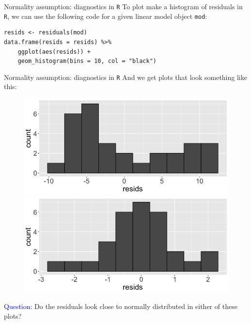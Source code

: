 \documentclass[10pt,t]{beamer}
\begin{document}
\begin{frame}[fragile]{Normality assumption: diagnostics in \texttt{R}}
To plot make a histogram of residuals in \texttt{R}, we can use the following code for a given linear model object \texttt{mod}:

\vspace{0.3cm}

\begin{lstlisting}
resids <- residuals(mod)
data.frame(resids = resids) %>%
    ggplot(aes(resids)) +
    geom_histogram(bins = 10, col = "black")
\end{lstlisting}

\end{frame}

\begin{frame}{Normality assumption: diagnostics in \texttt{R}}
And we get plots that look something like this:

	
\begin{figure}
	\centering 
	\includegraphics[scale=0.2]{hist_resid1.png} \\
    \includegraphics[scale=0.2]{hist_resid2.png}
\end{figure}

\textcolor{blue}{Question:} Do the residuals look close to normally distributed in either of these plots?

\end{frame}
\end{document}
